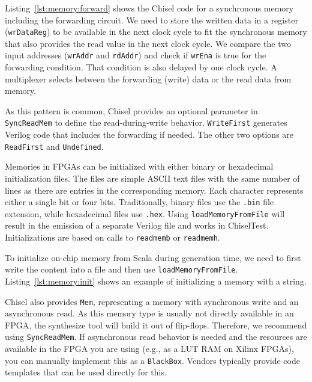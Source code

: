 \documentclass[%
    10pt,
    headinclude, footinclude=false,
    openright, %
    notitlepage,
    cleardoublepage=empty,
    headsepline,
    numbers=noenddot,
    bibliography=totoc, index=totoc,
    ]{scrbook}
\newcommand{\code}[1]{{\lstinline[basicstyle=\small\ttfamily]{#1}}}
\begin{document}
Listing~\ref{lst:memory:forward} shows the Chisel code for a synchronous memory
including the forwarding circuit. We need to store the written data in a register
(\code{wrDataReg}) to be available in the next clock cycle to fit
the synchronous memory that also provides the read value in the next clock
cycle.
We compare the two input addresses (\code{wrAddr} and \code{rdAddr})
and check if \code{wrEna} is true for the forwarding condition.
That condition is also delayed by one clock cycle.
A multiplexer selects between the forwarding (write) data or the read
data from memory.


As this pattern is common, Chisel provides an optional parameter in \code{SyncReadMem}
to define the read-during-write behavior. \code{WriteFirst} generates Verilog code that
includes the forwarding if needed. The other two options are \code{ReadFirst}
and \code{Undefined}.


Memories in FPGAs can be initialized with either binary or hexadecimal initialization files.
The files are simple ASCII text files with the same number of lines as there are
entries in the corresponding memory. Each character represents either a single bit
or four bits. Traditionally, binary files use the \code{.bin} file extension, while
hexadecimal files use \code{.hex}. Using \code{loadMemoryFromFile} will result in
the emission of a separate Verilog file and works in ChiselTest.
Initializations are based on calls to \code{readmemb} or \code{readmemh}.

To initialize on-chip memory from Scala during generation time, we need to first
write the content into a file and then use \code{loadMemoryFromFile}.
Listing~\ref{lst:memory:init} shows an example of initializing a memory with a string.



Chisel also provides \code{Mem}, representing a memory with synchronous
write and an asynchronous read. As this memory type is usually not directly available
in an FPGA, the synthesize tool will build it out of flip-flops.
Therefore, we recommend using \code{SyncReadMem}. If asynchronous read behavior is needed and
the resources are available in the FPGA you are using (e.g., as a LUT RAM on Xilinx
FPGAs), you can manually implement this as a \code{BlackBox}. Vendors typically provide
code templates that can be used directly for this.
\end{document}
